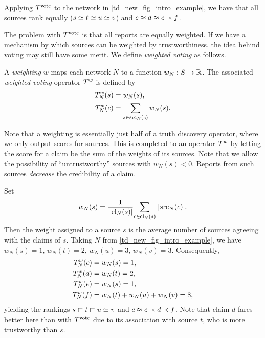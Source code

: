 Applying $T^{\operatorname{vote}}{}$ to the network in \cref{td_new_fig_intro_example}, we have
that all sources rank equally ($s \simeq t \simeq u \simeq v$) and $c \approx d \approx e
\prec f$.

The problem with $T^{\operatorname{vote}}{}$ is that all reports are equally weighted. If we
have a mechanism by which sources can be weighted by trustworthiness, the idea
behind voting may still have some merit. We define \emph{weighted voting} as
follows.

\begin{definition}
    A \emph{weighting} $w$ maps each network $N$ to a function $w_N: S \to \mathbb{R}$.
    The associated \emph{weighted voting} operator $T^{w}$ is defined by
    \begin{align*}
        T^{w}_N(s) &= w_N(s), \\
        T^{w}_N(c) &= \sum_{s \in \operatorname{src}_N(c)}{w_N(s)}.
    \end{align*}
\end{definition}

Note that a weighting is essentially just half of a truth discovery operator,
where we only output scores for sources. This is completed to an operator
$T^{w}$ by letting the score for a claim be the sum of the weights of its
sources. Note that we allow the possibility of ``untrustworthy'' sources with
$w_N(s) < 0$. Reports from such sources \emph{decrease} the credibility of a
claim.

\begin{example}
    \label{td_new_ex_weighted_voting}
    Set
    \[
        w_N(s) = \frac{1}{|\operatorname{cl}_N(s)|}{
            \sum_{c \in \operatorname{cl}_N(s)}{
                |\operatorname{src}_N(c)|
            }
        }.
    \]
    Then the weight assigned to a source $s$ is the average number of sources
    agreeing with the claims of $s$. Taking $N$ from
    \cref{td_new_fig_intro_example}, we have $w_N(s) = 1$, $w_N(t) = 2$,
    $w_N(u) = 3$, $w_N(v) = 3$.  Consequently,
    \begin{align*}
        T^{w}_N(c) &= w_N(s) = 1,\\
        T^{w}_N(d) &= w_N(t) = 2,\\
        T^{w}_N(e) &= w_N(s) = 1,\\
        T^{w}_N(f) &= w_N(t) + w_N(u) + w_N(v) = 8,
    \end{align*}
    yielding the rankings $s \sqsubset t \sqsubset u \simeq v$ and $c \approx e \prec d \prec
    f$. Note that claim $d$ fares better here than with $T^{\operatorname{vote}}$ due to its
    association with source $t$, who is more trustworthy than $s$.
\end{example}

